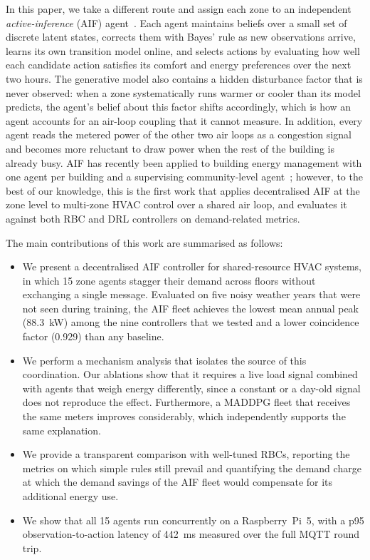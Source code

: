 \documentclass[conference]{IEEEtran}
\begin{document}
In this paper, we take a different route and assign each zone to an
independent \emph{active-inference} (AIF) agent~\cite{friston2017}. Each agent
maintains beliefs over a small set of discrete latent states, corrects them
with Bayes' rule as new observations arrive, learns its own transition model
online, and selects actions by evaluating how well each candidate action
satisfies its comfort and energy preferences over the next two hours. The
generative model also contains a hidden disturbance factor that is never
observed: when a zone systematically runs warmer or cooler than its model
predicts, the agent's belief about this factor shifts accordingly, which is how
an agent accounts for an air-loop coupling that it cannot measure. In addition,
every agent reads the metered power of the other two air loops as a congestion
signal and becomes more reluctant to draw power when the rest of the building
is already busy. AIF has recently been applied to building
energy management with one agent per building and a supervising
community-level agent~\cite{nazemi2025}; however, to the best of our knowledge,
this is the first work that applies decentralised AIF
at the zone level to multi-zone HVAC control over a shared air loop, and
evaluates it against both RBC and DRL
controllers on demand-related metrics.

The main contributions of this work are summarised as follows:
\begin{itemize}
\item We present a decentralised AIF controller for shared-resource HVAC
systems, in which 15 zone agents stagger their demand across floors without
exchanging a single message. Evaluated on five noisy weather years that were
not seen during training, the AIF fleet achieves the lowest mean annual peak
(\SI{88.3}{\kilo\watt}) among the nine controllers that we tested and a lower
coincidence factor (0.929) than any baseline.
\item We perform a mechanism analysis that isolates the source of this
coordination. Our ablations show that it requires a live load signal combined
with agents that weigh energy differently, since a constant or a day-old signal
does not reproduce the effect. Furthermore, a MADDPG fleet that receives the
same meters improves considerably, which independently supports the same
explanation.
\item We provide a transparent comparison with well-tuned RBCs, reporting the metrics on which simple rules still prevail and
quantifying the demand charge at which the demand savings of the AIF fleet
would compensate for its additional energy use.
\item We show that all 15 agents run concurrently on a Raspberry~Pi~5, with
a p95 observation-to-action latency of \SI{442}{\milli\second} measured over
the full MQTT round trip.
\end{itemize}
\end{document}
